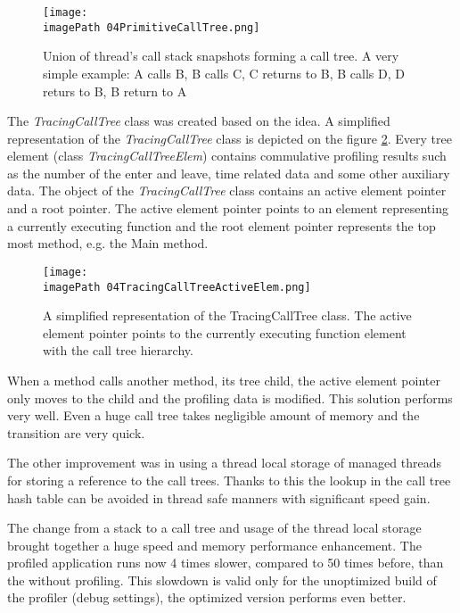 \begin{figure}
	\centering
		\texttt{[image: \\imagePath 04PrimitiveCallTree.png]}
		\caption{Union of thread's call stack snapshots forming a call tree. A very simple example: A calls  B, B calls C, C returns to B, B calls D, D returs to B, B return to A }
	\label{fig:04PrimitiveCallTree}
\end{figure}

The \textit{TracingCallTree} class was created based on the idea.
A simplified representation of the \textit{TracingCallTree} class is depicted on the figure \ref{fig:04TracingCallTreeActiveElem}. Every tree element (class \textit{TracingCallTreeElem}) contains commulative profiling results such as the number of the enter and leave, time related data and some other auxiliary data. The object of the \textit{TracingCallTree} class contains an active element pointer and a root pointer. The active element pointer points to an element representing a currently executing function and the root element pointer represents the top most method, e.g. the Main method. 


\begin{figure}
	\centering
		\texttt{[image: \\imagePath 04TracingCallTreeActiveElem.png]}
		\caption{A simplified representation of the TracingCallTree class. The active element pointer points to the currently executing function element with the call tree hierarchy. }
	\label{fig:04TracingCallTreeActiveElem}
\end{figure}


When a method calls another method, its tree child, the active element pointer only moves to the child and the profiling data is modified. This solution performs very well. Even a huge call tree takes negligible amount of memory and the transition are very quick. 

The other improvement was in using a thread local storage of managed threads for storing a reference to the call trees. Thanks to this the lookup in the call tree hash table can be avoided in thread safe manners with significant speed gain. 

The change from a stack to a call tree and usage of the thread local storage brought together a huge speed and memory performance enhancement. The profiled application runs now 4 times slower, compared to 50 times before, than the without profiling. This slowdown is valid only for the unoptimized build of the profiler (debug settings), the optimized version performs even better. 

